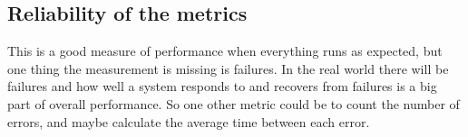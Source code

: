 \documentclass{article}
\theoremstyle{plain}
\theoremstyle{nonumberplain}
\begin{document}
\subsection{Reliability of the metrics}
This is a good measure of performance when everything runs as expected, but one thing the measurement is missing is failures. In the real world there will be failures and how well a system responds to and recovers from failures is a big part of overall performance. So one other metric could be to count the number of errors, and maybe calculate the average time between each error.
\end{document}
